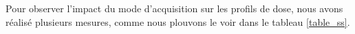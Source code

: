 \documentclass{book}
\begin{document}
Pour observer l'impact du mode d'acquisition sur les profils de dose, nous avons réalisé plusieurs mesures, comme nous plouvons le voir dans le tableau \ref*{table_ss}.


\end{document}
